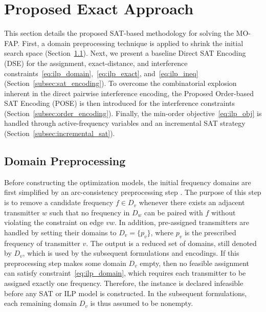 \documentclass[letterpaper,journal]{IEEEtran}
\begin{document}
\section{Proposed Exact Approach}
\label{sec:method}
This section details the proposed SAT-based methodology for solving the MO-FAP.
First, a domain preprocessing technique is applied to shrink the initial search space (Section~\ref{subsec:preprocessing}).
Next, we present a baseline Direct SAT Encoding (DSE) for the assignment, exact-distance, and interference constraints~\eqref{eq:ilp_domain},~\eqref{eq:ilp_exact}, and~\eqref{eq:ilp_ineq} (Section~\ref{subsec:sat_encoding}).
To overcome the combinatorial explosion inherent in the direct pairwise interference encoding, the Proposed Order-based SAT Encoding (POSE) is then introduced for the interference constraints (Section~\ref{subsec:order_encoding}).
Finally, the min-order objective~\eqref{eq:ilp_obj} is handled through active-frequency variables and an incremental SAT strategy (Section~\ref{subsec:incremental_sat}).

\subsection{Domain Preprocessing}
\label{subsec:preprocessing}
Before constructing the optimization models, the initial frequency domains are first simplified by an arc-consistency preprocessing step \cite{Aardal2007, Dib2009}. 
The purpose of this step is to remove a candidate frequency $f \in D_v$ whenever there exists an adjacent transmitter $w$ such that no frequency in $D_w$ can be paired with $f$ without violating the constraint on edge $vw$.
In addition, pre-assigned transmitters are handled by setting their domains to $D_v=\{p_v\}$, where $p_v$ is the prescribed frequency of transmitter $v$.
The output is a reduced set of domains, still denoted by $D_v$, which is used by the subsequent formulations and encodings.
If this preprocessing step makes some domain $D_v$ empty, then no feasible assignment can satisfy constraint~\eqref{eq:ilp_domain}, which requires each transmitter to be assigned exactly one frequency. Therefore, the instance is declared infeasible before any SAT or ILP model is constructed. In the subsequent formulations, each remaining domain $D_v$ is thus assumed to be nonempty.
\end{document}
